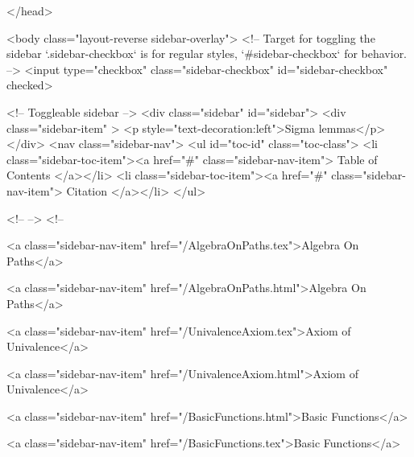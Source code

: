   
</head>




  <body class="layout-reverse sidebar-overlay">
    <!-- Target for toggling the sidebar `.sidebar-checkbox` is for regular
     styles, `#sidebar-checkbox` for behavior. -->
<input type="checkbox" class="sidebar-checkbox" id="sidebar-checkbox" checked>

<!-- Toggleable sidebar -->
<div class="sidebar" id="sidebar">
  <div class="sidebar-item" >
    <p style="text-decoration:left">Sigma lemmas</p>
  </div>
  <nav class="sidebar-nav">
    <ul id="toc-id" class="toc-class">
  <li class="sidebar-toc-item"><a href="#" class="sidebar-nav-item"> Table of Contents </a></li>
  <li class="sidebar-toc-item"><a href="#" class="sidebar-nav-item"> Citation </a></li>
</ul>


    <!--  -->
    <!-- 
      
    
      
    
      
    
      
        
      
    
      
        
          <a class="sidebar-nav-item" href="/AlgebraOnPaths.tex">Algebra On Paths</a>
        
      
    
      
        
          <a class="sidebar-nav-item" href="/AlgebraOnPaths.html">Algebra On Paths</a>
        
      
    
      
        
          <a class="sidebar-nav-item" href="/UnivalenceAxiom.tex">Axiom of Univalence</a>
        
      
    
      
        
          <a class="sidebar-nav-item" href="/UnivalenceAxiom.html">Axiom of Univalence</a>
        
      
    
      
        
          <a class="sidebar-nav-item" href="/BasicFunctions.html">Basic Functions</a>
        
      
    
      
        
          <a class="sidebar-nav-item" href="/BasicFunctions.tex">Basic Functions</a>
        
      
    
